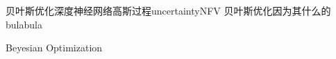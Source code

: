 
\begin{Cabstract}{贝叶斯优化}{深度神经网络}{高斯过程}{uncertainty}{NFV}
贝叶斯优化因为其什么的bulabula

Beyesian Optimization
\end{Cabstract}
